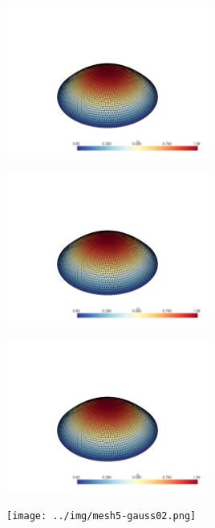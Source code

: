 \documentclass[
  11pt,
]{article}
\let\origfigure\figure
\let\endorigfigure\endfigure
\renewenvironment{figure}[1][2] {
    \expandafter\origfigure\expandafter[H]
} {
    \endorigfigure
}
\begin{document}
\begin{figure}
\centering
\includegraphics[width=0.5\textwidth,height=\textheight]{../img/mesh4-gauss08.png}
\caption{Finite element solution for problem 1 over mesh number 4 and
order-8 numerical integration.}
\end{figure}

\begin{figure}
\centering
\includegraphics[width=0.5\textwidth,height=\textheight]{../img/mesh4-gauss13.png}
\caption{Finite element solution for problem 1 over mesh number 4 and
order-13 numerical integration.}
\end{figure}

\begin{figure}
\centering
\includegraphics[width=0.5\textwidth,height=\textheight]{../img/mesh4-gauss19.png}
\caption{Finite element solution for problem 1 over mesh number 4 and
order-19 numerical integration.}
\end{figure}

\begin{figure}
\centering
\texttt{[image: ../img/mesh5-gauss02.png]}
\caption{Finite element solution for problem 1 over mesh number 5 and
order-2 numerical integration.}
\end{figure}
\end{document}
